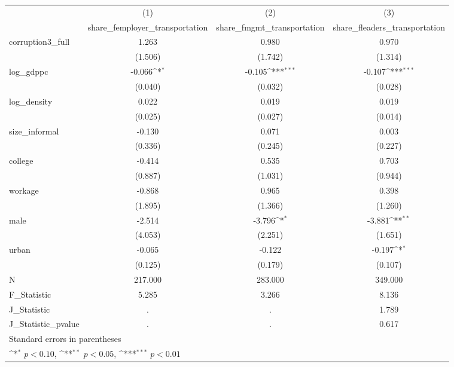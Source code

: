{
\def\sym#1{\ifmmode^{#1}\else\(^{#1}\)\fi}
\begin{tabular}{l*{3}{c}}
\hline\hline
            &\multicolumn{1}{c}{(1)}&\multicolumn{1}{c}{(2)}&\multicolumn{1}{c}{(3)}\\
            &\multicolumn{1}{c}{share\_femployer\_transportation}&\multicolumn{1}{c}{share\_fmgmt\_transportation}&\multicolumn{1}{c}{share\_fleaders\_transportation}\\
\hline
corruption3\_full&       1.263         &       0.980         &       0.970         \\
            &     (1.506)         &     (1.742)         &     (1.314)         \\
[1em]
log\_gdppc   &      -0.066\sym{*}  &      -0.105\sym{***}&      -0.107\sym{***}\\
            &     (0.040)         &     (0.032)         &     (0.028)         \\
[1em]
log\_density &       0.022         &       0.019         &       0.019         \\
            &     (0.025)         &     (0.027)         &     (0.014)         \\
[1em]
size\_informal&      -0.130         &       0.071         &       0.003         \\
            &     (0.336)         &     (0.245)         &     (0.227)         \\
[1em]
college     &      -0.414         &       0.535         &       0.703         \\
            &     (0.887)         &     (1.031)         &     (0.944)         \\
[1em]
workage     &      -0.868         &       0.965         &       0.398         \\
            &     (1.895)         &     (1.366)         &     (1.260)         \\
[1em]
male        &      -2.514         &      -3.796\sym{*}  &      -3.881\sym{**} \\
            &     (4.053)         &     (2.251)         &     (1.651)         \\
[1em]
urban       &      -0.065         &      -0.122         &      -0.197\sym{*}  \\
            &     (0.125)         &     (0.179)         &     (0.107)         \\
\hline
N           &     217.000         &     283.000         &     349.000         \\
F\_Statistic &       5.285         &       3.266         &       8.136         \\
J\_Statistic &           .         &           .         &       1.789         \\
J\_Statistic\_pvalue&           .         &           .         &       0.617         \\
\hline\hline
\multicolumn{4}{l}{\footnotesize Standard errors in parentheses}\\
\multicolumn{4}{l}{\footnotesize \sym{*} \(p<0.10\), \sym{**} \(p<0.05\), \sym{***} \(p<0.01\)}\\
\end{tabular}
}
